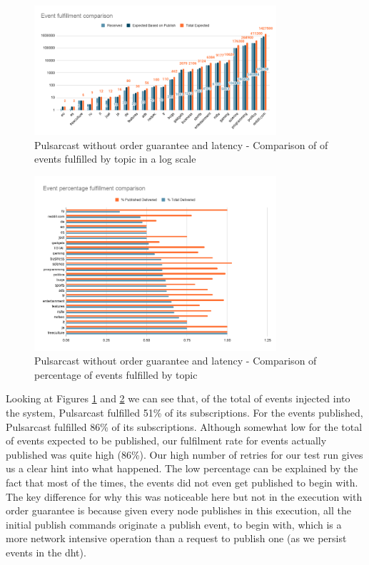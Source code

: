 \begin{figure}[!htb]
  \centering
  \includegraphics[width=0.8\textwidth]{img/graph-pulsarcast-latency-event-fulfillment-comparison.png}
  \caption{Pulsarcast without order guarantee and latency - Comparison of of events fulfilled by topic in a log scale}
  \label{fig:graph-pulsarcast-latency-event-fulfillment-comparison}
\end{figure}

\begin{figure}[!htb]
  \centering
  \includegraphics[width=0.8\textwidth]{img/graph-pulsarcast-latency-event-percentage-fulfillment-comparison.png}
  \caption{Pulsarcast without order guarantee and latency - Comparison of percentage of events fulfilled by topic}
  \label{fig:graph-pulsarcast-latency-event-percentage-fulfillment-comparison}
\end{figure}

Looking at Figures
\ref{fig:graph-pulsarcast-latency-event-fulfillment-comparison} and
\ref{fig:graph-pulsarcast-latency-event-percentage-fulfillment-comparison} we
can see that, of the total of events injected into the system, Pulsarcast
fulfilled 51\% of its subscriptions. For the  events published, Pulsarcast
fulfilled 86\% of its subscriptions. Although somewhat low for the total of
events expected to be published, our fulfilment rate for events actually
published was quite high (86\%). Our high number of retries for our test run
gives us a clear hint into what happened. The low percentage can be explained
by the fact that most of the times, the events did not even get published to
begin with. The key difference for why this was noticeable here but not in the
execution with order guarantee is because given every node publishes in this
execution, all the initial publish commands originate a publish event, to begin
with, which is a more network intensive operation than a request to publish one
(as we persist events in the \acrshort{dht}).

